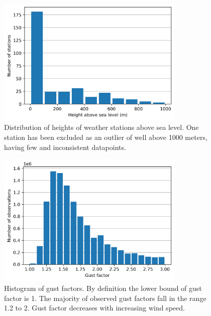 \begin{figure}[ht]
    \centering
    \includegraphics[width=0.8\textwidth]{Figures/station_heights.png}
    \caption[Distribution of weather station heights above sea level]{Distribution of heights of weather stations above sea level. One station has been excluded as an outlier of well above 1000 meters, having few and inconsistent datapoints.}
    \label{fig:station_heights}
\end{figure}

\begin{figure}[ht]
    \centering
    \includegraphics[width=0.8\textwidth]{Figures/gust_factor_2025.png}
    \caption[Distribution of gust factors]{Histogram of gust factors. By definition the lower bound of gust factor is 1. The majority of observed gust factors fall in the range 1.2 to 2. Gust factor decreases with increasing wind speed.}
    \label{fig:gust_factors}
\end{figure}

